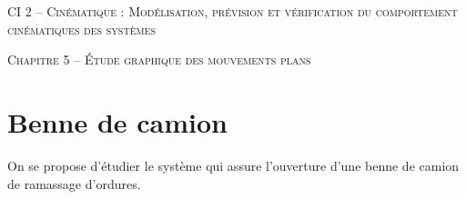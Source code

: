 \documentclass[11pt,oneside]{article}
\begin{document}
\pagestyle{fancy}
\renewcommand{\headrulewidth}{0pt}

\fancyhead{}

\fancyhead[C]{\rule{12cm}{.5pt}}


\renewcommand{\footrulewidth}{0.2pt}

\fancyfoot[C]{\footnotesize{\bfseries \thepage}}



\begin{center}
 \LARGE\textsc{CI 2 -- Cinématique : Modélisation, prévision et vérification du comportement cinématiques des systèmes}
\end{center}

\begin{center}
 \Large\textsc{Chapitre 5 -- Étude graphique des mouvements plans} 
\end{center}

\vspace{1cm}

\section{Benne de camion}

\setcounter{paragraph}{0}
On se propose d'étudier le système qui assure l'ouverture d'une benne de camion de ramassage d'ordures.
\end{document}
